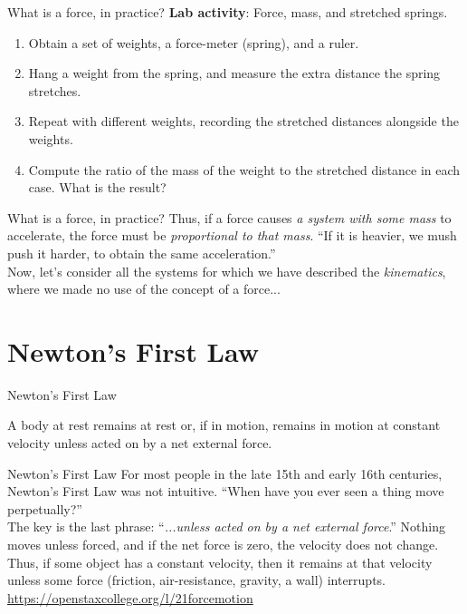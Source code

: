 \documentclass{beamer}
\begin{document}
\begin{frame}{What is a force, in practice?}
\textbf{Lab activity}: Force, mass, and stretched springs.
\begin{enumerate}
\item Obtain a set of weights, a force-meter (spring), and a ruler.
\item Hang a weight from the spring, and measure the extra distance the spring stretches.
\item Repeat with different weights, recording the stretched distances alongside the weights.
\item Compute the ratio of the mass of the weight to the stretched distance in each case.  What is the result?
\end{enumerate}
\end{frame}

\begin{frame}{What is a force, in practice?}
Thus, if a force causes \textit{a system with some mass} to accelerate, the force must be \textit{proportional to that mass}.  \alert{``If it is heavier, we mush push it harder, to obtain the same acceleration.''}  \\
\vspace{1cm}
Now, let's consider all the systems for which we have described the \textit{kinematics}, where we made no use of the concept of a force...
\end{frame}

\section{Newton's First Law}

\begin{frame}{Newton's First Law}
\begin{tcolorbox}[colback=white,colframe=red!40!blue,title=Newton's First Law]
\alert{A body at rest remains at rest or, if in motion, remains in motion at constant velocity unless acted on by a net external force.}
\end{tcolorbox}
\end{frame}

\begin{frame}{Newton's First Law}
\small
For most people in the late 15th and early 16th centuries, Newton's First Law was not intuitive.  ``When have you ever seen a thing move perpetually?''\\
\vspace{0.5cm}
The key is the last phrase: ``\textit{...unless acted on by a \alert{net} external force}.''  Nothing moves unless forced, and if the \alert{net} force is zero, the velocity does not change.  Thus, if some object has a constant velocity, then it remains at that velocity unless some force (friction, air-resistance, gravity, a wall) interrupts. \\
\vspace{0.5cm}
\url{https://openstaxcollege.org/l/21forcemotion}
\end{frame}
\end{document}
